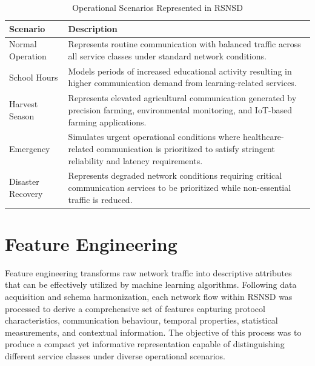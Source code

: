 \documentclass[12pt,a4paper]{report}
\begin{document}
	\begin{table}[H]
		\centering
		\caption{Operational Scenarios Represented in RSNSD}
		\label{tab:scenario_definition}
		
		\begin{tabular}{|p{4cm}|p{8cm}|}
			\hline
			
			\textbf{Scenario} &
			\textbf{Description}
			\\
			\hline
			
			Normal Operation &
			Represents routine communication with balanced traffic across all service classes under standard network conditions.
			\\
			\hline
			
			School Hours &
			Models periods of increased educational activity resulting in higher communication demand from learning-related services.
			\\
			\hline
			
			Harvest Season &
			Represents elevated agricultural communication generated by precision farming, environmental monitoring, and IoT-based farming applications.
			\\
			\hline
			
			Emergency &
			Simulates urgent operational conditions where healthcare-related communication is prioritized to satisfy stringent reliability and latency requirements.
			\\
			\hline
			
			Disaster Recovery &
			Represents degraded network conditions requiring critical communication services to be prioritized while non-essential traffic is reduced.
			\\
			\hline
			
		\end{tabular}
		
	\end{table}
	
	
	\section{Feature Engineering}
	\label{sec:feature_engineering}
	
	Feature engineering transforms raw network traffic into descriptive attributes that can be effectively utilized by machine learning algorithms. Following data acquisition and schema harmonization, each network flow within RSNSD was processed to derive a comprehensive set of features capturing protocol characteristics, communication behaviour, temporal properties, statistical measurements, and contextual information. The objective of this process was to produce a compact yet informative representation capable of distinguishing different service classes under diverse operational scenarios.
	
\end{document}
